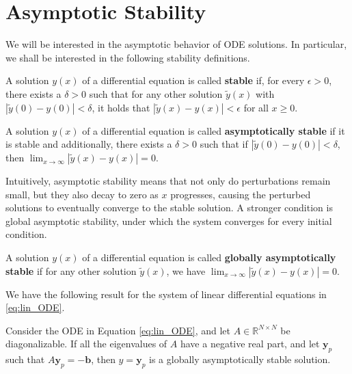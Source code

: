 \section{Asymptotic Stability}

We will be interested in the asymptotic behavior of ODE solutions. In particular, we shall be interested in the following stability definitions.

\begin{definition}[Stability]
A solution \( y(x) \) of a differential equation is called \textbf{stable} if, for every \( \epsilon > 0 \), there exists a \( \delta > 0 \) such that for any other solution \( \tilde{y}(x) \) with \( |\tilde{y}(0) - y(0)| < \delta \), it holds that \( |\tilde{y}(x) - y(x)| < \epsilon \) for all \( x \geq 0 \).    
\end{definition}

\begin{definition}
A solution \( y(x) \) of a differential equation is called \textbf{asymptotically stable} if it is stable and additionally, there exists a \( \delta > 0 \) such that if \( |\tilde{y}(0) - y(0)| < \delta \), then \( \lim_{x \to \infty} |\tilde{y}(x) - y(x)| = 0 \).
\end{definition}

Intuitively, asymptotic stability means that not only do perturbations remain small, but they also decay to zero as $x$ progresses, causing the perturbed solutions to eventually converge to the stable solution. A stronger condition is global asymptotic stability, under which the system converges for every initial condition.

\begin{definition}
A solution \( y(x) \) of a differential equation is called \textbf{globally asymptotically stable} if for any other solution \( \tilde{y}(x) \), we have  \( \lim_{x \to \infty} |\tilde{y}(x) - y(x)| = 0 \).
\end{definition}

We have the following result for the system of linear differential equations in \eqref{eq:lin_ODE}.

\begin{theorem}
Consider the ODE in Equation \eqref{eq:lin_ODE}, and let $A\in \mathbb{R}^{N \times N}$ be diagonalizable. If all the eigenvalues of $A$ have a negative real part, and let $\mathbf{y}_p$ such that $A\mathbf{y}_p = -\mathbf{b}$, then $y = \mathbf{y}_p$ is a globally asymptotically stable solution.
\end{theorem}


